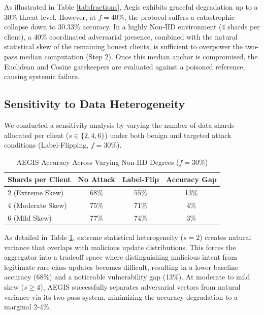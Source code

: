 \documentclass[10pt, conference]{IEEEtran}
\begin{document}
As illustrated in Table \ref{tab:fractions}, Aegis exhibits graceful degradation up to a 30\% threat level. However, at $f=40\%$, the protocol suffers a catastrophic collapse down to 30.33\% accuracy. In a highly Non-IID environment (4 shards per client), a 40\% coordinated adversarial presence, combined with the natural statistical skew of the remaining honest clients, is sufficient to overpower the two-pass median computation (Step 2). Once this median anchor is compromised, the Euclidean and Cosine gatekeepers are evaluated against a poisoned reference, causing systemic failure.

\subsection{Sensitivity to Data Heterogeneity}
We conducted a sensitivity analysis by varying the number of data shards allocated per client ($s \in \{2, 4, 6\}$) under both benign and targeted attack conditions (Label-Flipping, $f=30\%$). 

\begin{table}[htbp]
\centering
\caption{AEGIS Accuracy Across Varying Non-IID Degrees ($f=30\%$)}
\begin{tabular}{@{}lccc@{}}
\toprule
\textbf{Shards per Client} & \textbf{No Attack} & \textbf{Label-Flip} & \textbf{Accuracy Gap} \\ \midrule
2 (Extreme Skew) & 68\% & 55\% & 13\% \\
4 (Moderate Skew) & 75\% & 71\% & 4\% \\
6 (Mild Skew) & 77\% & 74\% & 3\% \\ \bottomrule
\end{tabular}
\label{tab:shards}
\end{table}

As detailed in Table \ref{tab:shards}, extreme statistical heterogeneity ($s=2$) creates natural variance that overlaps with malicious update distributions. This forces the aggregator into a tradeoff space where distinguishing malicious intent from legitimate rare-class updates becomes difficult, resulting in a lower baseline accuracy (68\%) and a noticeable vulnerability gap (13\%). At moderate to mild skew ($s \ge 4$), AEGIS successfully separates adversarial vectors from natural variance via its two-pass system, minimizing the accuracy degradation to a marginal 2-4\%.
\end{document}
